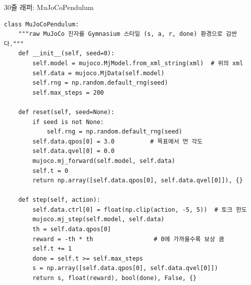 \documentclass[aspectratio=169,11pt]{beamer}
\begin{document}

\begin{frame}[fragile]{30줄 래퍼: MuJoCoPendulum}
\begin{lstlisting}
class MuJoCoPendulum:
    """raw MuJoCo 진자를 Gymnasium 스타일 (s, a, r, done) 환경으로 감싼다."""
    def __init__(self, seed=0):
        self.model = mujoco.MjModel.from_xml_string(xml)  # 위의 xml
        self.data = mujoco.MjData(self.model)
        self.rng = np.random.default_rng(seed)
        self.max_steps = 200

    def reset(self, seed=None):
        if seed is not None:
            self.rng = np.random.default_rng(seed)
        self.data.qpos[0] = 3.0          # 목표에서 먼 각도
        self.data.qvel[0] = 0.0
        mujoco.mj_forward(self.model, self.data)
        self.t = 0
        return np.array([self.data.qpos[0], self.data.qvel[0]]), {}

    def step(self, action):
        self.data.ctrl[0] = float(np.clip(action, -5, 5))  # 토크 한도
        mujoco.mj_step(self.model, self.data)
        th = self.data.qpos[0]
        reward = -th * th                 # 0에 가까울수록 보상 큼
        self.t += 1
        done = self.t >= self.max_steps
        s = np.array([self.data.qpos[0], self.data.qvel[0]])
        return s, float(reward), bool(done), False, {}
\end{lstlisting}
\end{frame}
\end{document}
